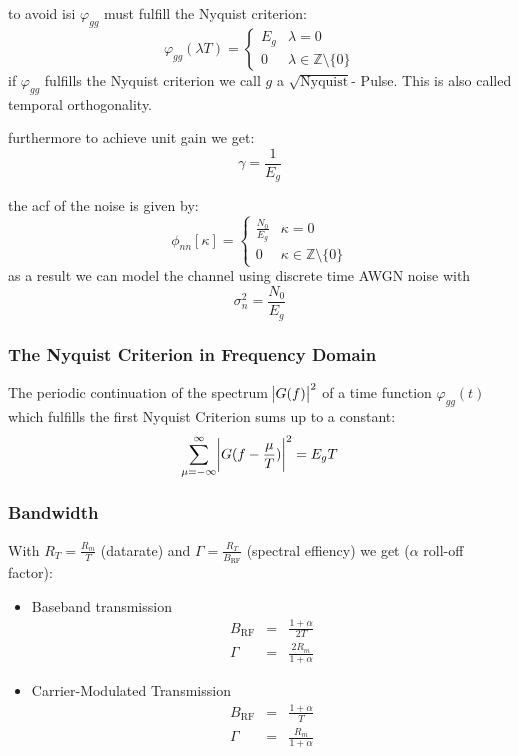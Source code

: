 to avoid \ac{isi} $\varphi_{gg}$ must fulfill the Nyquist criterion:
\begin{equation}
    \varphi_{gg}(\lambda T) =
    \begin{cases}
        E_g & \lambda = 0 \\
        0 & \lambda \in \mathbb{Z} \setminus \{0\}
    \end{cases}
\end{equation}
if $\varphi_{gg}$ fulfills the Nyquist criterion we call $g$ a $\sqrt{\text{Nyquist}}$-
Pulse. This is also called temporal orthogonality.

furthermore to achieve unit gain we get:
\begin{equation}
    \gamma = \frac{1}{E_g}
\end{equation}

the \ac{acf} of the noise is given by:
\begin{equation}
    \phi_{nn}[\kappa] =
    \begin{cases}
        \frac{N_0}{E_g} & \kappa = 0 \\
        0 & \kappa \in \mathbb{Z} \setminus \{0\}
    \end{cases}
\end{equation}
as a result we can model the channel using discrete time AWGN noise with
\begin{equation}
    \sigma_n^2 = \frac{N_0}{E_g}
\end{equation}

\subsubsection{The Nyquist Criterion in Frequency Domain}
The periodic continuation of the spectrum $\abs{G(f)}^2$ of a time function 
$\varphi_{gg}(t)$ which fulfills the first Nyquist Criterion sums up to a constant:
\begin{equation}
    \sum_{\mu=-\infty}^\infty \abs{G(f - \frac{\mu}{T})}^2 = E_g T
\end{equation}

\subsubsection{Bandwidth}
With $R_T = \frac{R_m}{T}$ (datarate) and $\Gamma = \frac{R_T}{B_\text{RF}}$ 
(spectral effiency) we get ($\alpha$ roll-off factor):
\begin{itemize}
    \item Baseband transmission
        \begin{eqnarray}
            B_\text{RF} &=& \frac{1 + \alpha}{2 T} \\
            \Gamma &=& \frac{2 R_m}{1 + \alpha}
        \end{eqnarray}
    \item Carrier-Modulated Transmission
        \begin{eqnarray}
            B_\text{RF} &=& \frac{1 + \alpha}{T} \\
            \Gamma &=& \frac{R_m}{1 + \alpha} 
        \end{eqnarray}
\end{itemize}

